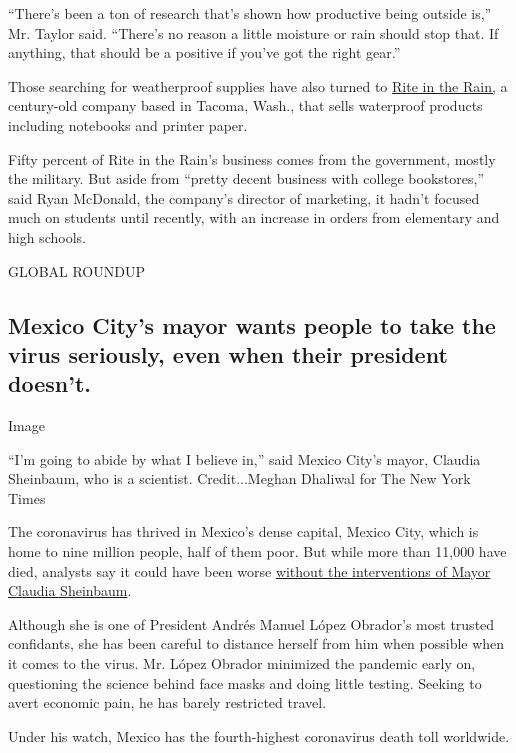 ``There's been a ton of research that's shown how productive being
outside is,'' Mr. Taylor said. ``There's no reason a little moisture or
rain should stop that. If anything, that should be a positive if you've
got the right gear.''

Those searching for weatherproof supplies have also turned to
\href{https://www.riteintherain.com/}{Rite in the Rain,} a century-old
company based in Tacoma, Wash., that sells waterproof products including
notebooks and printer paper.

Fifty percent of Rite in the Rain's business comes from the government,
mostly the military. But aside from ``pretty decent business with
college bookstores,'' said Ryan McDonald, the company's director of
marketing, it hadn't focused much on students until recently, with an
increase in orders from elementary and high schools.

GLOBAL ROUNDUP

\hypertarget{mexico-citys-mayor-wants-people-to-take-the-virus-seriously-even-when-their-president-doesnt}{%
\subsection{Mexico City's mayor wants people to take the virus
seriously, even when their president
doesn't.}\label{mexico-citys-mayor-wants-people-to-take-the-virus-seriously-even-when-their-president-doesnt}}

Image

``I'm going to abide by what I believe in,'' said Mexico City's mayor,
Claudia Sheinbaum, who is a scientist. Credit...Meghan Dhaliwal for The
New York Times

The coronavirus has thrived in Mexico's dense capital, Mexico City,
which is home to nine million people, half of them poor. But while more
than 11,000 have died, analysts say it could have been worse
\href{https://www.nytimes3xbfgragh.onion/2020/09/05/world/americas/mexico-mayor-amlo-sheinbaum.html}{without
the interventions of Mayor Claudia Sheinbaum}.

Although she is one of President Andrés Manuel López Obrador's most
trusted confidants, she has been careful to distance herself from him
when possible when it comes to the virus. Mr. López Obrador minimized
the pandemic early on, questioning the science behind face masks and
doing little testing. Seeking to avert economic pain, he has barely
restricted travel.

Under his watch, Mexico has the fourth-highest coronavirus death toll
worldwide.


